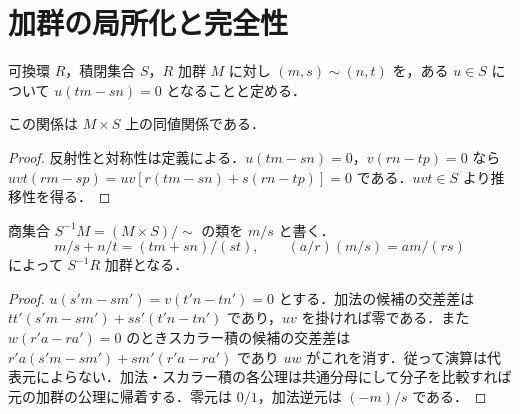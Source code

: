 \section{加群の局所化と完全性}
\begin{defn}[加群の分数の関係]
可換環 $R$，積閉集合 $S$，$R$ 加群 $M$ に対し $(m,s)\sim(n,t)$ を，ある $u\in S$ について $u(tm-sn)=0$ となることと定める．
\end{defn}
\begin{prop}[分数の同値関係]
この関係は $M\times S$ 上の同値関係である．
\end{prop}
\begin{proof}
反射性と対称性は定義による．$u(tm-sn)=0$，$v(rn-tp)=0$ なら $uvt(rm-sp)=uv[r(tm-sn)+s(rn-tp)]=0$ である．$uvt\in S$ より推移性を得る．
\end{proof}
\begin{prop}[局所化加群]
商集合 $S^{-1}M=(M\times S)/{\sim}$ の類を $m/s$ と書く．
\[
m/s+n/t=(tm+sn)/(st),\qquad (a/r)(m/s)=am/(rs)
\]
によって $S^{-1}R$ 加群となる．
\end{prop}
\begin{proof}
$u(s'm-sm')=v(t'n-tn')=0$ とする．加法の候補の交差差は $tt'(s'm-sm')+ss'(t'n-tn')$ であり，$uv$ を掛ければ零である．また $w(r'a-ra')=0$ のときスカラー積の候補の交差差は $r'a(s'm-sm')+sm'(r'a-ra')$ であり $uw$ がこれを消す．従って演算は代表元によらない．加法・スカラー積の各公理は共通分母にして分子を比較すれば元の加群の公理に帰着する．零元は $0/1$，加法逆元は $(-m)/s$ である．
\end{proof}

